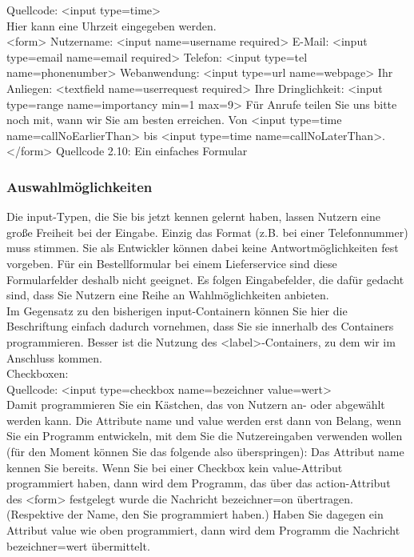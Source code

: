 Quellcode: <input type=time>\\

Hier kann eine Uhrzeit eingegeben werden.\\

<form>
Nutzername: <input name=username required>
E-Mail: <input type=email name=email required>
Telefon: <input type=tel name=phonenumber>
Webanwendung: <input type=url name=webpage>
Ihr Anliegen: <textfield name=userrequest required>
Ihre Dringlichkeit: <input type=range name=importancy min=1 max=9>
Für Anrufe teilen Sie uns bitte noch mit, wann wir Sie am besten erreichen. Von <input type=time name=callNoEarlierThan> bis <input type=time name=callNoLaterThan>.
</form>
Quellcode 2.10: Ein einfaches Formular

\subsubsection{Auswahlmöglichkeiten}

Die input-Typen, die Sie bis jetzt kennen gelernt haben, lassen Nutzern eine große Freiheit bei der Eingabe. Einzig das Format (z.B. bei einer Telefonnummer) muss stimmen. Sie als Entwickler können dabei keine Antwortmöglichkeiten fest vorgeben. Für ein Bestellformular bei einem Lieferservice sind diese Formularfelder deshalb nicht geeignet. Es folgen Eingabefelder, die dafür gedacht sind, dass Sie Nutzern eine Reihe an Wahlmöglichkeiten anbieten.\\

Im Gegensatz zu den bisherigen input-Containern können Sie hier die Beschriftung einfach dadurch vornehmen, dass Sie sie innerhalb des Containers programmieren. Besser ist die Nutzung des <label>-Containers, zu dem wir im Anschluss kommen.\\

Checkboxen:\\

Quellcode: <input type=checkbox name=bezeichner value=wert>\\

Damit programmieren Sie ein Kästchen, das von Nutzern an- oder abgewählt werden kann.
Die Attribute name und value werden erst dann von Belang, wenn Sie ein Programm entwickeln, mit dem Sie die Nutzereingaben verwenden wollen (für den Moment können Sie das folgende also überspringen): Das Attribut name kennen Sie bereits. Wenn Sie bei einer Checkbox kein value-Attribut programmiert haben, dann wird dem Programm, das über das action-Attribut des <form> festgelegt wurde die Nachricht bezeichner=on übertragen. (Respektive der Name, den Sie programmiert haben.) Haben Sie dagegen ein Attribut value wie oben programmiert, dann wird dem Programm die Nachricht bezeichner=wert übermittelt.\\

